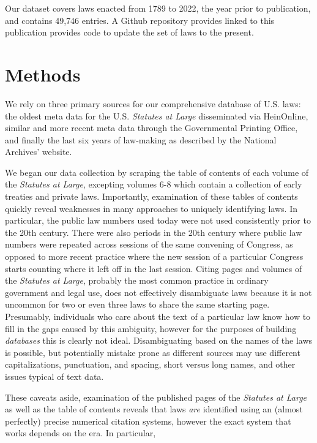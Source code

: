 \documentclass[fleqn,10pt]{wlscirep}
\begin{document}
 Our dataset covers laws enacted from 1789 to 2022, the year prior to publication, and contains 49,746 entries. A Github repository provides linked to this publication provides code to update the set of laws to the present.


\section*{Methods}

We rely on three primary sources for our comprehensive database of U.S. laws: the oldest meta data for the U.S. \emph{Statutes at Large} disseminated via HeinOnline, similar and more recent meta data through the Governmental Printing Office, and finally the last six years of law-making as described by the National Archives' website.

We began our data collection by scraping the table of contents of each volume of the \emph{Statutes at Large}, excepting volumes 6-8 which contain a collection of early treaties and private laws. Importantly, examination of these tables of contents quickly reveal weaknesses in many approaches to uniquely identifying laws. In particular, the public law numbers used today were not used consistently prior to the 20th century. There were also periods in the 20th century where public law numbers were repeated across sessions of the same convening of Congress, as opposed to more recent practice where the new session of a particular Congress starts counting where it left off in the last session. Citing pages and volumes of the \emph{Statutes at Large}, probably the most common practice in ordinary government and legal use, does not effectively disambiguate laws because it is not uncommon for two or even three laws to share the same starting page. Presumably, individuals who care about the text of a particular law know how to fill in the gaps caused by this ambiguity, however for the purposes of building \textit{databases} this is clearly not ideal. Disambiguating based on the names of the laws is possible, but potentially mistake prone as different sources may use different capitalizations, punctuation, and spacing, short versus long names, and other issues typical of text data. 

These caveats aside, examination of the published pages of the \emph{Statutes at Large} as well as the table of contents reveals that laws \textit{are} identified using an (almost perfectly) precise numerical citation systems, however the exact system that works depends on the era. In particular,
\end{document}
